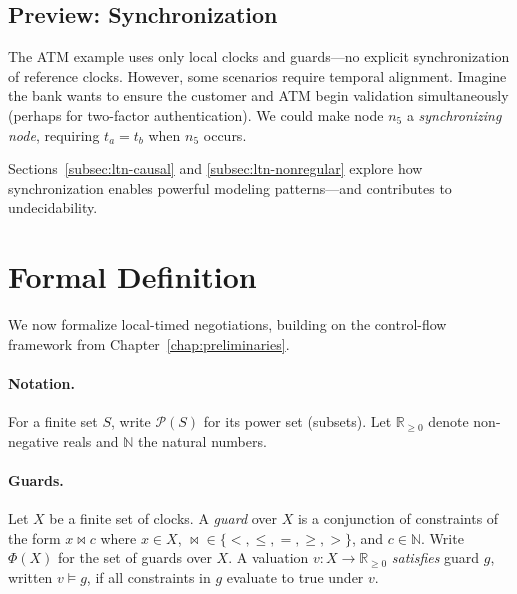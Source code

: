 \subsection{Preview: Synchronization}

The ATM example uses only local clocks and guards—no explicit synchronization of reference clocks. However, some scenarios require temporal alignment. Imagine the bank wants to ensure the customer and ATM begin validation simultaneously (perhaps for two-factor authentication). We could make node $n_5$ a \emph{synchronizing node}, requiring $t_a = t_b$ when $n_5$ occurs.

Sections~\ref{subsec:ltn-causal} and \ref{subsec:ltn-nonregular} explore how synchronization enables powerful modeling patterns—and contributes to undecidability.


\section{Formal Definition}
\label{sec:ltn-def}

We now formalize local-timed negotiations, building on the control-flow framework from Chapter~\ref{chap:preliminaries}.

\paragraph{Notation.} For a finite set $S$, write $\mathcal{P}(S)$ for its power set (subsets). Let $\mathbb{R}_{\geq 0}$ denote non-negative reals and $\mathbb{N}$ the natural numbers.

\paragraph{Guards.} Let $X$ be a finite set of clocks. A \emph{guard} over $X$ is a conjunction of constraints of the form $x \bowtie c$ where $x \in X$, $\bowtie \in \{<, \leq, =, \geq, >\}$, and $c \in \mathbb{N}$. Write $\Phi(X)$ for the set of guards over $X$. A valuation $v : X \to \mathbb{R}_{\geq 0}$ \emph{satisfies} guard $g$, written $v \models g$, if all constraints in $g$ evaluate to true under $v$.

